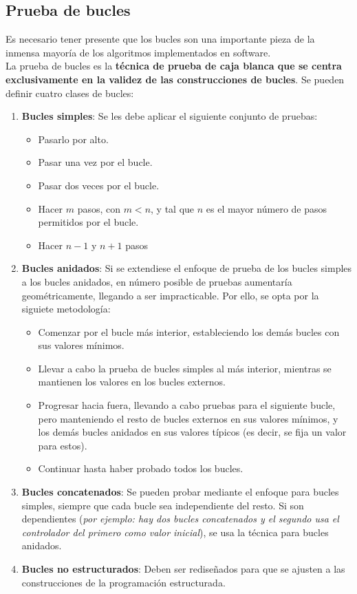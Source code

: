 \subsection{Prueba de bucles}

Es necesario tener presente que los bucles son una importante pieza de la inmensa mayoría de los algoritmos implementados en software.\\

La prueba de bucles es la \textbf{técnica de prueba de caja blanca que se centra exclusivamente en la validez de las construcciones de bucles}. Se pueden definir cuatro clases de bucles:

\begin{enumerate}
    \item \textbf{Bucles simples}: Se les debe aplicar el siguiente conjunto de pruebas:
          \begin{itemize}
              \item Pasarlo por alto.
              \item Pasar una vez por el bucle.
              \item Pasar dos veces por el bucle.
              \item Hacer $m$ pasos, con $m < n$, y tal que $n$ es el mayor número de pasos permitidos por el bucle.
              \item Hacer $n-1$ y $n+1$ pasos
          \end{itemize}

    \item \textbf{Bucles anidados}: Si se extendiese el enfoque de prueba de los bucles simples a los bucles anidados, en número posible de pruebas aumentaría geométricamente, llegando a ser impracticable. Por ello, se opta por la siguiete metodología:
          \begin{itemize}
              \item Comenzar por el bucle más interior, estableciendo los demás bucles con sus valores mínimos.
              \item Llevar a cabo la prueba de bucles simples al más interior, mientras se mantienen los valores en los bucles externos.
              \item Progresar hacia fuera, llevando a cabo pruebas para el siguiente bucle, pero manteniendo el resto de bucles externos en sus valores mínimos, y los demás bucles anidados en sus valores típicos (es decir, se fija un valor para estos).
              \item Continuar hasta haber probado todos los bucles.
          \end{itemize}
    \item \textbf{Bucles concatenados}: Se pueden probar mediante el enfoque para bucles simples, siempre que cada bucle sea independiente del resto. Si son dependientes (\textit{por ejemplo: hay dos bucles concatenados y el segundo usa el controlador del primero como valor inicial}), se usa la técnica para bucles anidados.
    \item \textbf{Bucles no estructurados}: Deben ser rediseñados para que se ajusten a las construcciones de la programación estructurada.
\end{enumerate}

